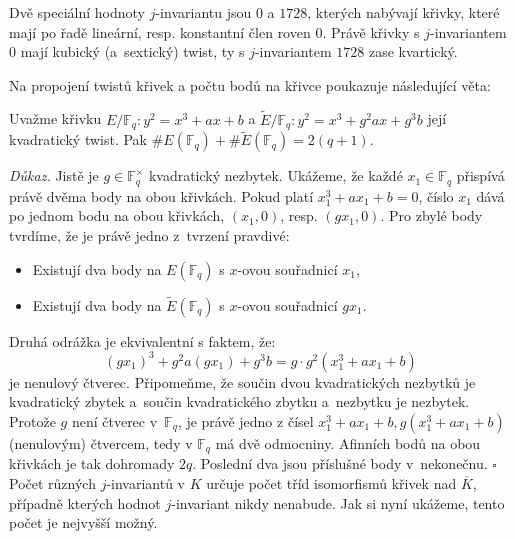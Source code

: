 \documentclass[12pt]{report}
\begin{document}
Dvě speciální hodnoty $j$-invariantu jsou $0$ a $1728$, kterých nabývají křivky, které mají po řadě lineární, resp. konstantní člen roven $0$. Právě křivky s $j$-invariantem $0$ mají kubický (a~sextický) twist, ty s $j$-invariantem $1728$ zase kvartický.

Na propojení twistů křivek a počtu bodů na křivce poukazuje následující věta:

\begin{veta}\label{twister}
Uvažme křivku $E/\mathbb{F}_q : y^2 = x^3+ax+b$ a  $ \tilde{E}/\mathbb{F}_q : y^2 = x^3 + g^2 ax + g^3 b $ její kvadratický twist. Pak $\#E(\mathbb{F}_q) + \# \tilde{E}(\mathbb{F}_q) = 2(q+1)$.
\end{veta}
\noindent \textit{Důkaz.} Jistě je $g \in \mathbb{F}^\times_q$ kvadratický nezbytek. Ukážeme, že každé $x_1 \in \mathbb{F}_q$ přispívá právě dvěma body na obou křivkách. Pokud platí $x_1^3 + ax_1 + b = 0$, číslo $x_1$ dává po jednom bodu na obou křivkách, $(x_1,0)$, resp. $(g x_1,0)$. Pro zbylé body tvrdíme, že je právě jedno z~tvrzení pravdivé: 
\begin{itemize}
\item Existují dva body na $E(\mathbb{F}_q)$ s $x$-ovou souřadnicí $x_1$,
\item Existují dva body na $\tilde{E}(\mathbb{F}_q)$ s $x$-ovou souřadnicí $gx_1$.
\end{itemize}
Druhá odrážka je ekvivalentní s faktem, že: 
\begin{equation*}
(gx_1)^3 + g^2 a (gx_1) + g^3 b = g \cdot g^2 (x_1^3+ax_1+b)
\end{equation*}
je nenulový čtverec. Připomeňme, že součin dvou kvadratických nezbytků je kvadratický zbytek a~součin kvadratického zbytku a~nezbytku je nezbytek. Protože $g$ není čtverec v~$\mathbb{F}_q$, je právě jedno z čísel $x_1 ^3 + ax_1 + b, g(x_1 ^3 + ax_1 + b)$ (nenulovým) čtvercem, tedy v $\mathbb{F}_q$ má dvě odmocniny. Afinních bodů na obou křivkách je tak dohromady $2q$. Poslední dva jsou příslušné body v~nekonečnu. \hfill $\square$\\

Počet různých $j$-invariantů v $K$ určuje počet tříd isomorfismů křivek nad $\overline{K}$, případně kterých hodnot $j$-invariant nikdy nenabude. Jak si nyní ukážeme, tento počet je nejvyšší možný.
\end{document}

